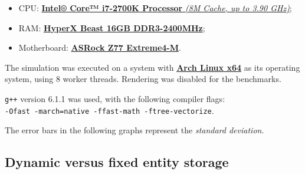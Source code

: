 \documentclass[twoside, 12pt, a4paper, openright]{book}
\begin{document}
\begin{itemize}
\item
  CPU:
  \href{http://ark.intel.com/products/61275/Intel-Core-i7-2700K-Processor-8M-Cache-up-to-3_90-GHz}{\textbf{Intel®
  Core™ i7-2700K Processor} \emph{(8M Cache, up to 3.90 GHz)}};
\item
  RAM: \href{http://www.hyperxgaming.com/us/memory/beast}{\textbf{HyperX
  Beast 16GB DDR3-2400MHz}};
\item
  Motherboard:
  \href{http://www.asrock.com/mb/intel/z77\%20extreme4-m/}{\textbf{ASRock
  Z77 Extreme4-M}}.
\end{itemize}

The simulation was executed on a system with
\href{https://www.archlinux.org/}{\textbf{Arch Linux x64}} as its
operating system, using \(8\) worker threads. Rendering was disabled for
the benchmarks.

\texttt{g++}
version 6.1.1 was used, with the following compiler flags:\\
\texttt{-Ofast -march=native -ffast-math -ftree-vectorize}.

The error bars in the following graphs represent the \emph{standard
deviation}.

\subsection{Dynamic versus fixed entity
storage}\label{dynamic-versus-fixed-entity-storage}
\end{document}
